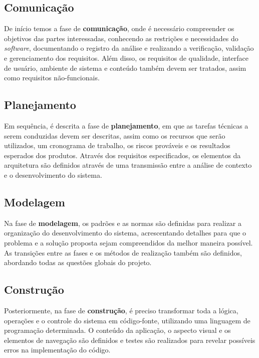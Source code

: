 \subsection{Comunicação}
\label{sec-ref-comunicacao}

De início temos a fase de \textbf{comunicação}, onde é necessário compreender os objetivos das partes interessadas, conhecendo as restrições e necessidades do \textit{software}, documentando o registro da análise e realizando a verificação, validação e gerenciamento dos requisitos. Além disso, os requisitos de qualidade, interface de usuário, ambiente de sistema e conteúdo também devem ser tratados, assim como requisitos não-funcionais.

\subsection{Planejamento}
\label{sec-ref-planejamento}

Em sequência, é descrita a fase de \textbf{planejamento}, em que as tarefas técnicas a serem conduzidas devem ser descritas, assim como os recursos que serão utilizados, um cronograma de trabalho, os riscos prováveis e os resultados esperados dos produtos. Através dos requisitos especificados, os elementos da arquitetura são definidos através de uma transmissão entre a análise de contexto e o desenvolvimento do sistema.

\subsection{Modelagem}
\label{sec-ref-modelagem}

Na fase de \textbf{modelagem}, os padrões e as normas são definidas para realizar a organização do desenvolvimento do sistema, acrescentando detalhes para que o problema e a solução proposta sejam compreendidos da melhor maneira possível. As transições entre as fases e os métodos de realização também são definidos, abordando todas as questões globais do projeto.   

\subsection{Construção}
\label{sec-ref-construcao}

Posteriormente, na fase de \textbf{construção}, é preciso transformar toda a lógica, operações e o controle do sistema em código-fonte, utilizando uma linguagem de programação determinada. O conteúdo da aplicação, o aspecto visual e os elementos de navegação são definidos e testes são realizados para revelar possíveis erros na implementação do código. 

